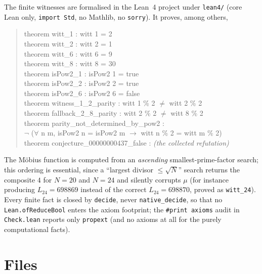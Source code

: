 \documentclass[11pt]{article}
\theoremstyle{definition}
\theoremstyle{remark}
\begin{document}
The finite witnesses are formalised in the Lean~4 project under
\texttt{lean4/} (core Lean only, \texttt{import Std}, no Mathlib, no
\texttt{sorry}). It proves, among others,
\begin{quote}\ttfamily
theorem witt\_1 : witt 1 = 2\\
theorem witt\_2 : witt 2 = 1\\
theorem witt\_6 : witt 6 = 9\\
theorem witt\_8 : witt 8 = 30\\
theorem isPow2\_1 : isPow2 1 = true\\
theorem isPow2\_2 : isPow2 2 = true\\
theorem isPow2\_6 : isPow2 6 = false\\
theorem witness\_1\_2\_parity : witt 1 \% 2 \(\neq\) witt 2 \% 2\\
theorem fallback\_2\_8\_parity : witt 2 \% 2 \(\neq\) witt 8 \% 2\\
theorem parity\_not\_determined\_by\_pow2 :\\
\hspace*{2em}\(\neg\) (\(\forall\) n m, isPow2 n = isPow2 m \(\to\) witt n \% 2 = witt m \% 2)\\
theorem conjecture\_00000000437\_false : \textit{(the collected refutation)}
\end{quote}
The Möbius function is computed from an \emph{ascending} smallest-prime-factor
search; this ordering is essential, since a ``largest divisor $\le \sqrt N$''
search returns the composite $4$ for $N = 20$ and $N = 24$ and silently
corrupts $\mu$ (for instance producing $L_{24} = 698869$ instead of the correct
$L_{24} = 698870$, proved as \texttt{witt\_24}). Every finite fact is closed by
\texttt{decide}, never \texttt{native\_decide}, so that no
\texttt{Lean.ofReduceBool} enters the axiom footprint; the
\texttt{\#print axioms} audit in \texttt{Check.lean} reports only
\texttt{propext} (and no axioms at all for the purely computational facts).

\section{Files}
\end{document}
